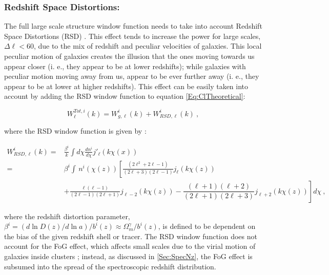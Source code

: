 \subsubsection{Redshift Space Distortions:}\label{Sec:RSD}
The full large scale structure window function needs to take into account Redshift Space Distortions (RSD) \citep{Blake2007,Padm2007,Thomas2011}. This effect tends to increase the power for large scales, $\Delta \ell < 60$, due to the mix of redshift and peculiar velocities of galaxies. This local peculiar motion of galaxies creates the illusion that the ones moving towards us appear closer (i. e., they appear to be at lower redshifts); while galaxies with peculiar motion moving away from us, appear to be ever further away (i. e., they appear to be at lower at higher redshifts). This effect can be easily taken into account by adding the RSD window function  \citep{ScharfLahav1992, FisherLahav1994, Kirk2015, 2016McLeod} to equation \eqref{Eq:ClTheoretical}:

\begin{equation}\label{Eq:Window_counts}
W^{Tot,i}_{\ell}(k) = W^i_{g, \ell}(k) + W^i_{RSD,\ell}(k) \ , 
\end{equation}

where the RSD window function is given by \citep{ScharfLahav1992, Padm2007,Ho2012,Kirk2015}:

\begin{equation}
\begin{split}
W^i_{RSD,\ell}(k)  = & \frac{\beta^i}{k} \int d\chi \frac{dn^i}{d\chi} j'_{\ell}(k\chi (x)) \\
 = & \beta^i \int \, n^i(\chi(z))\left[ \frac{(2\ell^2 + 2\ell -1)}{(2\ell + 3)(2\ell -1)}j_{\ell}(k\chi(z)) \right. \\
& \left. + \frac{\ell(\ell-1)}{(2\ell-1)(2\ell+1)}j_{\ell-2}(k\chi(z)) -  \dfrac{(\ell+1)(\ell+2)}{(2\ell+1)(2\ell+3)}j_{\ell+2}(k\chi(z)) \right] d\chi \ ,
\end{split}
\end{equation}

where the redshift distortion parameter, $\beta^i = (d \ln D(z)/d\ln a)/b^{i}(z) \approx \Omega_m^{\gamma}/b^i(z)$, is defined to be dependent on the bias of the given redshift shell or tracer. The RSD window function does not account for the FoG effect, which affects small scales due to the virial motion of galaxies inside clusters \citep{Kang2002}; instead, as discussed in \ref{Sec:SpecNz}, the FoG effect is subsumed into the spread of the spectroscopic redshift distribution.  

